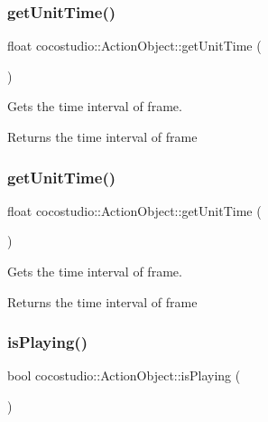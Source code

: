 \subsubsection{\texorpdfstring{get\+Unit\+Time()}{getUnitTime()}\hspace{0.1cm}{\footnotesize\ttfamily [1/2]}}
{\footnotesize\ttfamily float cocostudio\+::\+Action\+Object\+::get\+Unit\+Time (\begin{DoxyParamCaption}{ }\end{DoxyParamCaption})}

Gets the time interval of frame.

\begin{DoxyReturn}{Returns}
the time interval of frame 
\end{DoxyReturn}
\mbox{\label{classcocostudio_1_1ActionObject_a4cf75b80f67a1a170616b39d352f989e}} 
\subsubsection{\texorpdfstring{get\+Unit\+Time()}{getUnitTime()}\hspace{0.1cm}{\footnotesize\ttfamily [2/2]}}
{\footnotesize\ttfamily float cocostudio\+::\+Action\+Object\+::get\+Unit\+Time (\begin{DoxyParamCaption}{ }\end{DoxyParamCaption})}

Gets the time interval of frame.

\begin{DoxyReturn}{Returns}
the time interval of frame 
\end{DoxyReturn}
\mbox{\label{classcocostudio_1_1ActionObject_ab3a5940502a32dbd778990dc1a47389a}} 
\subsubsection{\texorpdfstring{is\+Playing()}{isPlaying()}\hspace{0.1cm}{\footnotesize\ttfamily [1/2]}}
{\footnotesize\ttfamily bool cocostudio\+::\+Action\+Object\+::is\+Playing (\begin{DoxyParamCaption}{ }\end{DoxyParamCaption})}

